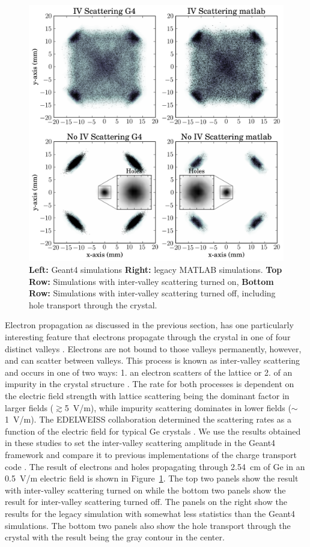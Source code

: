 
\begin{figure}
	\centering
		\includegraphics[width=1.0\textwidth]{intervalley.png}
	\caption{\textbf{Left:} Geant4 simulations \textbf{Right:} legacy MATLAB simulations. \textbf{Top Row:} Simulations with inter-valley scattering turned on, \textbf{Bottom Row:} Simulations with inter-valley scattering turned off, including hole transport through the crystal.}
	\label{fig:intervalley}
\end{figure}

Electron propagation as discussed in the previous section, has one particularly interesting feature that electrons propagate through the crystal in one of four distinct valleys \cite{Cabrera,Leman}. Electrons are not bound to those valleys permanently, however, and can scatter between valleys. This process is known as inter-valley scattering and occurs in one of two ways: 1. an electron scatters of the lattice or 2. of an impurity in the crystal structure \cite{iv}. The rate for both processes is dependent on the electric field strength with lattice scattering being the dominant factor in larger fields ($\gtrsim$5~V/m), while impurity scattering dominates in lower fields ($\sim$1~V/m). The EDELWEISS \cite{edelweiss} collaboration determined the scattering rates as a function of the electric field for typical Ge crystals \cite{iv}. We use the results obtained in these studies to set the inter-valley scattering amplitude in the Geant4 framework and compare it to previous implementations of the charge transport code \cite{Cabrera,Leman}. The result of electrons and holes propagating through 2.54~cm of Ge in an 0.5~V/m electric field is shown in Figure~\ref{fig:intervalley}. The top two panels show the result with inter-valley scattering turned on while the bottom two panels show the result for inter-valley scattering turned off. The panels on the right show the results for the legacy simulation \cite{Cabrera,Leman} with somewhat less statistics than the Geant4 simulations. The bottom two panels also show the hole transport through the crystal with the result being the gray contour in the center. 
